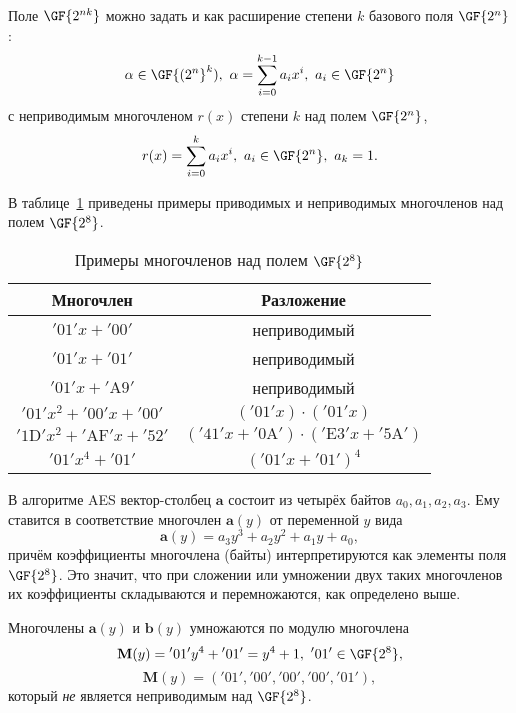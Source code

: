 Поле $\GF{2^{nk}}$ можно задать и как расширение степени $k$ базового поля $\GF{2^n}$:
    \[ \alpha \in \GF{(2^n}^k), ~ \alpha = \sum\limits_{i=0}^{k-1} a_i x^i, ~ a_i \in \GF{2^n} \]
с неприводимым многочленом $r(x)$ степени $k$ над полем $\GF{2^n}$,
    \[ r(x) = \sum\limits_{i=0}^{k} a_i x^i, ~ a_i \in \GF{2^n}, ~ a_k = 1. \]

\example
В таблице~\ref{tab:irreducible-gf8} приведены примеры приводимых и неприводимых многочленов над полем $\GF{2^8}$.
\begin{table}[!ht]
    \centering
    \caption{Примеры многочленов над полем $\GF{2^8}$\label{tab:irreducible-gf8}}
    \begin{tabular}{|c|c|}
        \hline
        Многочлен & Разложение \\
        \hline
        $\mathrm{'01'} x + \mathrm{'00'}$ & неприводимый \\
        $\mathrm{'01'} x + \mathrm{'01'}$ & неприводимый \\
        $\mathrm{'01'} x + \mathrm{'A9'}$ & неприводимый \\
        $\mathrm{'01'} x^2 + \mathrm{'00'} x + \mathrm{'00'}$ & $(\mathrm{'01'} x) \cdot (\mathrm{'01'} x)$ \\
        $\mathrm{'1D'} x^2 + \mathrm{'AF'} x + \mathrm{'52'}$ & $(\mathrm{'41'} x + \mathrm{'0A'}) \cdot (\mathrm{'E3'} x + \mathrm{'5A'})$ \\
        $\mathrm{'01'} x^4 + \mathrm{'01'}$ & $(\mathrm{'01'} x + \mathrm{'01'})^4$ \\
        \hline
    \end{tabular}
\end{table}
\exampleend

В алгоритме AES вектор-столбец $\mathbf{a}$ состоит из четырёх байтов $a_{0}, a_{1}, a_{2}, a_{3}$. Ему ставится в соответствие многочлен $\mathbf{a}(y)$ от переменной $y$ вида
    \[ \mathbf{a}(y) = a_{3}y^{3}+a_{2}y^{2}+a_{1}y+a_{0}, \]
причём коэффициенты многочлена (байты) интерпретируются как элементы поля $\GF{2^{8}}$. Это значит, что при сложении или умножении двух таких многочленов их коэффициенты складываются и перемножаются, как определено выше.

Многочлены $\mathbf{a}(y)$ и $\mathbf{b}(y)$ умножаются по модулю многочлена
    \[ \mathbf{M}(y)= \mathrm{'01'} y^4 + \mathrm{'01'} = y^4 + 1, ~ \mathrm{'01'} \in \GF{2^8}, \]
    \[ \mathbf{M}(y)= (\mathrm{'01'}, \mathrm{'00'},\mathrm{'00'}, \mathrm{'00'}, \mathrm{'01'}), \]
который \emph{не} является неприводимым над $\GF{2^8}$.


